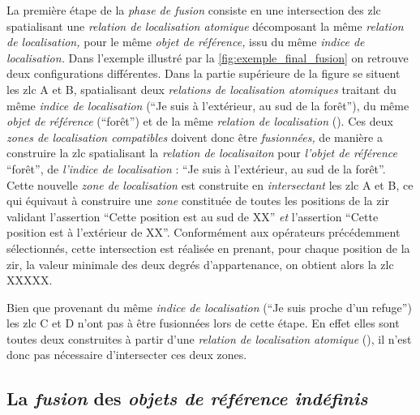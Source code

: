 La première étape de la \emph{phase de fusion} consiste en une
intersection des \ac{zlc} spatialisant une \emph{relation de
  localisation atomique} décomposant la même \emph{relation de
  localisation,} pour le même \emph{objet de référence,} issu du même
\emph{indice de localisation.} Dans l'exemple illustré par la
\autoref{fig:exemple_final_fusion} on retrouve deux configurations
différentes. Dans la partie supérieure de la figure se situent les
\ac{zlc} \textcolor{RdBu-9-1}{\textsf{A}} et
\textcolor{RdBu-9-2}{\textsf{B}}, spatialisant deux \emph{relations de
  localisation atomiques} traitant du même \emph{indice de
  localisation} (\enquote{Je suis à l'extérieur, au sud de la forêt}),
du même \emph{objet de référence} (\enquote{forêt}) et de la même
\emph{relation de localisation}
(). Ces deux \emph{zones de
  localisation compatibles} doivent donc être \emph{fusionnées,} de
manière a construire la \ac{zlc} spatialisant la \emph{relation de
  localisaiton}  pour
\emph{l'objet de référence} \enquote{forêt}, de \emph{l'indice de
  localisation} : \enquote{Je suis à l'extérieur, au sud de la
  forêt}. Cette nouvelle \emph{zone de localisation} est construite en
\emph{intersectant} les \ac{zlc} \textcolor{RdBu-9-1}{\textsf{A}} et
\textcolor{RdBu-9-2}{\textsf{B}}, ce qui équivaut à construire une
\emph{zone} constituée de toutes les positions de la \ac{zir} validant
l'assertion \enquote{Cette position est au sud de XX} \emph{et}
l'assertion \enquote{Cette position est à l'extérieur de
  XX}. Conformément aux opérateurs précédemment sélectionnés, cette
intersection est réalisée en prenant, pour chaque position de la
\ac{zir}, la valeur minimale des deux degrés d'appartenance, on
obtient alors la \ac{zlc} XXXXX.

Bien que provenant du même \emph{indice de localisation} (\enquote{Je
  suis proche d'un refuge}) les \ac{zlc}
\textcolor{RdBu-9-8}{\textsf{C}} et \textcolor{RdBu-9-9}{\textsf{D}}
n'ont pas à être fusionnées lors de cette étape. En effet elles sont
toutes deux construites à partir d'une \emph{relation de localisation
  atomique} (), il n'est donc pas nécessaire
d'intersecter ces deux zones.

\subsection{La \emph{fusion} des \emph{objets de référence indéfinis}}

